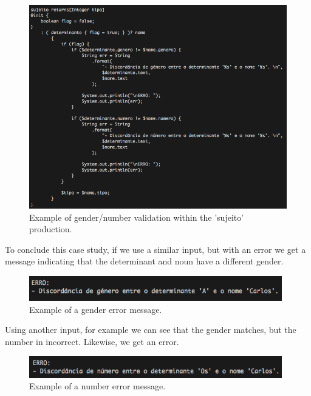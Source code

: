 \begin{figure}[h]
    \centering
    \includegraphics[width=13cm]{images/dsl_GenderNumber_validation.png}
    \caption{Example of gender/number validation within the 'sujeito' production.}
    \label{fig:sujeito_dsl_excerpt}
\end{figure}

To conclude this case study, if we use a similar input, but with an error
we get a message indicating that the determinant and noun have a different gender.

\begin{figure}[h]
    \centering
    \includegraphics[width=11cm]{images/dsl_gender_error.png}
    \caption{Example of a gender error message.}
    \label{fig:erro_gender_dsl_excerpt}
\end{figure}

\noindent Using another input, for example
we can see that the gender matches, but the number in incorrect. Likewise, we get an error.

\begin{figure}[h]
    \centering
    \includegraphics[width=11cm]{images/dsl_number_error.png}
    \caption{Example of a number error message.}
    \label{fig:erro_number_dsl_excerpt}
\end{figure}
